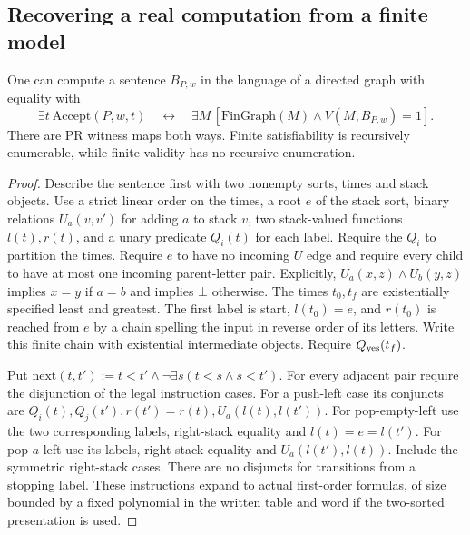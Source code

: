 \subsection{Recovering a real computation from a finite model}
\begin{theorem}\label{thm:trakh}
One can compute a sentence $B_{P,w}$ in the language of a directed graph with equality with
\[
 \exists t\ \mathrm{Accept}(P,w,t)
 \quad\longleftrightarrow\quad
 \exists M\,[\mathrm{FinGraph}(M)\wedge V(M,B_{P,w})=1].
\]
There are PR witness maps both ways. Finite satisfiability is recursively enumerable, while finite validity has no recursive enumeration.
\end{theorem}
\begin{proof}
Describe the sentence first with two nonempty sorts, times and stack objects. Use a strict linear order on the times, a root $e$ of the stack sort, binary relations $U_a(v,v')$ for adding $a$ to stack $v$, two stack-valued functions $l(t),r(t)$, and a unary predicate $Q_i(t)$ for each label. Require the $Q_i$ to partition the times. Require $e$ to have no incoming $U$ edge and require every child to have at most one incoming parent-letter pair. Explicitly, $U_a(x,z)\wedge U_b(y,z)$ implies $x=y$ if $a=b$ and implies $\bot$ otherwise. The times $t_0,t_f$ are existentially specified least and greatest. The first label is start, $l(t_0)=e$, and $r(t_0)$ is reached from $e$ by a chain spelling the input in reverse order of its letters. Write this finite chain with existential intermediate objects. Require $Q_{\rm yes}(t_f)$.

Put $\mathrm{next}(t,t') := t<t'\wedge\neg\exists s(t<s\wedge s<t')$. For every adjacent pair require the disjunction of the legal instruction cases. For a push-left case its conjuncts are $Q_i(t),Q_j(t'),r(t')=r(t),U_a(l(t),l(t'))$. For pop-empty-left use the two corresponding labels, right-stack equality and $l(t)=e=l(t')$. For pop-$a$-left use its labels, right-stack equality and $U_a(l(t'),l(t))$. Include the symmetric right-stack cases. There are no disjuncts for transitions from a stopping label. These instructions expand to actual first-order formulas, of size bounded by a fixed polynomial in the written table and word if the two-sorted presentation is used.


\end{proof}
